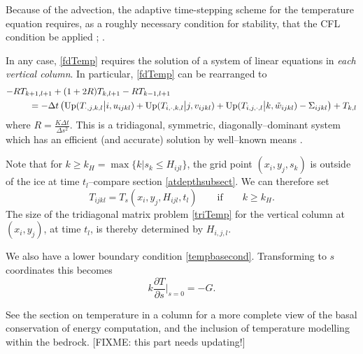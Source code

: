 \documentclass[12pt,final]{amsart}%
\theoremstyle{plain}
\theoremstyle{definition}
\theoremstyle{remark}
\newcommand{\dds}[1]{\ensuremath{\frac{\partial #1}{\partial s}}}
\newcommand{\Up}{\ensuremath{\operatorname{Up}}}
\begin{document}
Because of the advection, the adaptive time-stepping scheme for the temperature equation requires, as a roughly necessary condition for stability, that the CFL condition be applied \citep[see][]{BBL}; \citep[compare][]{MortonMayers}.

In any case, \eqref{fdTemp} requires the solution of a system of linear equations in \emph{each vertical column}.  In particular, \eqref{fdTemp} can be rearranged to
\begin{align}\label{triTemp}
-R &T_{k+1,l+1} + (1+2R) T_{k,l+1} - R T_{k-1,l+1} \\
    &\quad = -\Delta t \left(\Up(T_{\cdot,j,k,l} \big|i,u_{ijkl}) + \Up(T_{i,\cdot,k,l} \big|j,v_{ijkl}) + \Up(T_{i,j,\cdot,l} \big|k,\tilde w_{ijkl}) - \Sigma_{ijkl}\right) + T_{k,l}\notag
\end{align}
where $R=\frac{K\Delta t}{\Delta s^2}$.  This is a tridiagonal, symmetric, diagonally--dominant system which has an efficient (and accurate) solution by well--known means \citep{Pressetal}.

Note that for $k \ge k_H = \max\{k\big|s_k\le H_{ijl}\}$, the grid point $(x_i,y_j,s_k)$ is outside of the ice at time $t_l$--compare section \ref{atdepthsubsect}.  We can therefore set
\begin{equation}\label{Taboveice}
T_{ijkl}=T_s(x_i,y_j,H_{ijl},t_l) \qquad \text{if} \qquad k\ge k_H.
\end{equation}
The size of the tridiagonal matrix problem \eqref{triTemp} for the vertical column at $(x_i,y_j)$, at time $t_l$, is thereby determined by $H_{i,j,l}$.

We also have a lower boundary condition \eqref{tempbasecond}.  Transforming to $s$ coordinates this becomes
\begin{equation}\label{stempbasecond}
k\dds{T}\Big|_{s=0} = -G.
\end{equation}

See the section on temperature in a column for a more complete view of the basal conservation of energy computation, and the inclusion of temperature modelling within the bedrock.  [FIXME: this part needs updating!]
\end{document}
